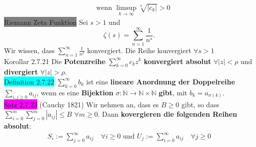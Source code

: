 \documentclass[landscape, 10pt]{article}
\newcommand{\N}{\mathbb{N}}
\begin{document}
\begin{multicols}{3}
\begin{align*}
                            &\text{ wenn }
                            \limsup\limits_{k\to\infty}
                            \sqrt[k]{|c_k|} >0
                     \end{align*}
              \colorbox{gray}{Riemann Zeta Funktion} Sei $s>1$ und 
                     \begin{equation*}
                            \zeta(s)=\sum_{n=1}^\infty\frac{1}{n^s}.
                     \end{equation*}
                     Wir wissen, dass
                     \textcolor{NavyBlue}{
                     $\sum_{n=1}^\infty\frac{1}{n^2}$} konvergiert.
                     Die Reihe konvergiert 
                     \textcolor{NavyBlue}{$\forall s>1$}\\
              \colorbox{BurntOrange}{Korollar 2.7.21}
                     Die \textbf{Potenzreihe}
                     \textcolor{NavyBlue}{$\sum_{k=0}^\infty c_kz^k$}
                     \textbf{konvergiert absolut} 
                     \textcolor{NavyBlue}{$\forall |z|<\rho$} und \textbf{divergiert} 
                     \textcolor{NavyBlue}{$\forall |z|>\rho$}.\\
              \colorbox{cyan}{Definition 2.7.22} 
                     \textcolor{NavyBlue}{$\sum_{k=0}^\infty b_k$}
                     ist eine \textbf{lineare Anordnung der Doppelreihe} 
                     \textcolor{NavyBlue}{$\sum_{i,j\geqslant0}a_{ij}$}, 
                     wenn es eine 
                     \textbf{Bijektion} 
                     \textcolor{NavyBlue}{$\sigma:\N\longrightarrow\N\times\N$}
                     \textbf{gibt}, mit 
                     \textcolor{NavyBlue}{$b_k=a_{\sigma(k)}$}.\\
              \colorbox{magenta}{Satz 2.7.23} 
              (Cauchy 1821) 
                     Wir nehmen an, dass es 
                     \textcolor{NavyBlue}{$B\geqslant0$} gibt, so dass 
                     \textcolor{NavyBlue}{
                     $\sum_{i=0}^m\sum_{j=0}^m|a_{ij}|\leqslant B$
                     \quad
                     $\forall m\geqslant0$}.
                     Dann 
                     \textbf{kovergieren die folgenden Reihen absolut}: 
                     \begin{align*}
                            S_i:=\sum_{j=0}^\infty a_{ij} \quad
                            \forall i\geqslant0
                            \text{ und }
                            U_j:=\sum_{i=0}^\infty a_{ij} \quad
                            \forall j\geqslant0

\end{align*}
\end{multicols}
\end{document}
